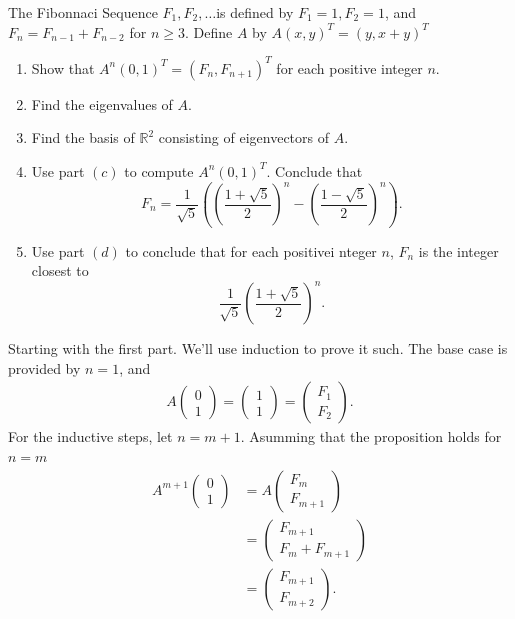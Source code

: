 \documentclass[5pt, a4paper]{article}
\begin{document}
\begin{tcolorbox}[title=Question 7]
    The Fibonnaci Sequence $F_1,F_2,\ldots$is defined by $F_1= 1, F_2 = 1$, and
    $F_n = F_{n-1} + F_{n-2}$ for $n \ge  3$. Define $A$ by $A(x,y)^T =
    (y,x+y)^T$
    \begin{enumerate}[label=(\alph*)]
         \item Show that $A^n(0,1)^T = (F_n, F_{n+1})^T$ for each positive
             integer $n$.
         \item Find the eigenvalues of $A$.
         \item Find the basis of $\mathbb{R}^2$ consisting of eigenvectors of
             $A$.
         \item Use part $(c)$ to compute $A^n(0,1)^T$. Conclude that  \[
                 F_n = \frac{1}{\sqrt{5}}\left( \left( \frac{1 + \sqrt{5} }{2}
                 \right)^n - \left( \frac{1 - \sqrt{5} }{2} \right)^n \right) 
         .\] 
     \item Use part $(d)$ to conclude that for each positivei nteger $n$, $F_n$
         is the integer closest to  \[
         \frac{1}{\sqrt{5} }\left( \frac{1 + \sqrt{5} }{2} \right)^n 
         .\] 
    \end{enumerate}
\end{tcolorbox} 
Starting with the first part. We'll use induction to prove it such. The base
case is provided by $n=1$, and 
 \begin{align*}
    A \begin{pmatrix} 0 \\ 1 \end{pmatrix} = \begin{pmatrix} 1 \\ 1
\end{pmatrix} =\begin{pmatrix} F_1 \\ F_2 \end{pmatrix} 
.\end{align*}
For the inductive steps, let $n=m+1$. Asumming that the proposition holds for $n=m$
\begin{align*}
    A^{m+1}\begin{pmatrix} 0 \\ 1 \end{pmatrix} &= A \begin{pmatrix} F_m \\
F_{m+1} \end{pmatrix}  \\
    &=  \begin{pmatrix} F_{m+1} \\ F_m + F_{m+1} \end{pmatrix} \\
    &= \begin{pmatrix} F_{m+1} \\ F_{m+2} \end{pmatrix}  
.\end{align*}
\end{document}
